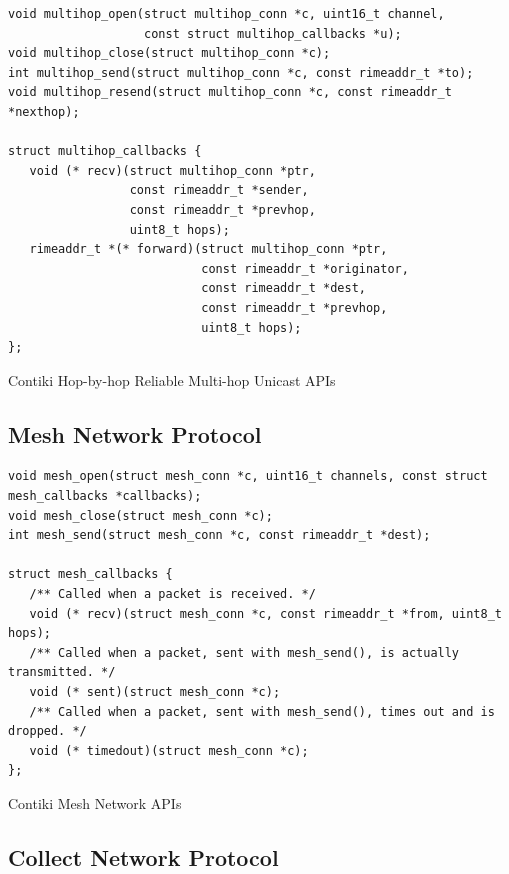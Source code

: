 \begin{listing}[H]
\begin{verbatim}
void multihop_open(struct multihop_conn *c, uint16_t channel,
                   const struct multihop_callbacks *u);
void multihop_close(struct multihop_conn *c);
int multihop_send(struct multihop_conn *c, const rimeaddr_t *to);
void multihop_resend(struct multihop_conn *c, const rimeaddr_t *nexthop);

struct multihop_callbacks {
   void (* recv)(struct multihop_conn *ptr,
                 const rimeaddr_t *sender,
                 const rimeaddr_t *prevhop,
                 uint8_t hops);
   rimeaddr_t *(* forward)(struct multihop_conn *ptr,
                           const rimeaddr_t *originator,
                           const rimeaddr_t *dest,
                           const rimeaddr_t *prevhop,
                           uint8_t hops);
};
\end{verbatim}
\caption{Contiki Hop-by-hop Reliable Multi-hop Unicast APIs}
\end{listing}


\subsection{Mesh Network Protocol}

\begin{listing}[H]
\begin{verbatim}
void mesh_open(struct mesh_conn *c, uint16_t channels, const struct mesh_callbacks *callbacks);
void mesh_close(struct mesh_conn *c);
int mesh_send(struct mesh_conn *c, const rimeaddr_t *dest);

struct mesh_callbacks {
   /** Called when a packet is received. */
   void (* recv)(struct mesh_conn *c, const rimeaddr_t *from, uint8_t hops);
   /** Called when a packet, sent with mesh_send(), is actually transmitted. */
   void (* sent)(struct mesh_conn *c);
   /** Called when a packet, sent with mesh_send(), times out and is dropped. */
   void (* timedout)(struct mesh_conn *c);
};
\end{verbatim}
\caption{Contiki Mesh Network APIs}
\end{listing}


\subsection{Collect Network Protocol}

